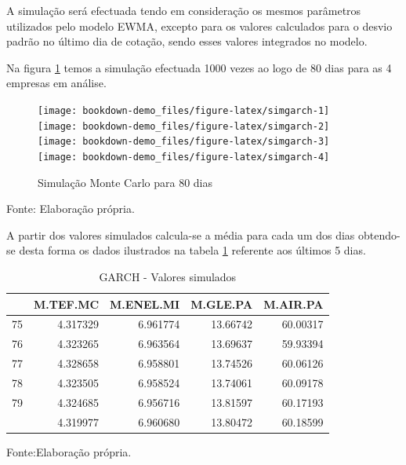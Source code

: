 \documentclass[
  12pt,
  a4paper,
  openany]{book}
\begin{document}
A simulação será efectuada tendo em consideração os mesmos parâmetros utilizados pelo modelo EWMA, excepto para os valores calculados para o desvio padrão no último dia de cotação, sendo esses valores integrados no modelo.

Na figura \ref{fig:simgarch} temos a simulação efectuada 1000 vezes ao logo de 80 dias para as 4 empresas em análise.

\begin{figure}

{\centering \texttt{[image: bookdown-demo\_files/figure-latex/simgarch-1]} \texttt{[image: bookdown-demo\_files/figure-latex/simgarch-2]} \texttt{[image: bookdown-demo\_files/figure-latex/simgarch-3]} \texttt{[image: bookdown-demo\_files/figure-latex/simgarch-4]} 

}

\caption{Simulação Monte Carlo para 80 dias}\label{fig:simgarch}
\end{figure}
\FloatBarrier
\centering

Fonte: Elaboração própria.

\justifying
\bigskip

A partir dos valores simulados calcula-se a média para cada um dos dias obtendo-se desta forma os dados ilustrados na tabela \ref{tab:simtabgarch} referente aos últimos 5 dias.

\begin{table}[!h]

\caption{\label{tab:simtabgarch}GARCH - Valores simulados}
\centering
\begin{tabular}[t]{lrrrr}
\toprule
  & M.TEF.MC & M.ENEL.MI & M.GLE.PA & M.AIR.PA\\
\midrule
75 & 4.317329 & 6.961774 & 13.66742 & 60.00317\\
76 & 4.323265 & 6.963564 & 13.69637 & 59.93394\\
77 & 4.328658 & 6.958801 & 13.74526 & 60.06126\\
78 & 4.323505 & 6.958524 & 13.74061 & 60.09178\\
79 & 4.324685 & 6.956716 & 13.81597 & 60.17193\\
\addlinespace
80 & 4.319977 & 6.960680 & 13.80472 & 60.18599\\
\bottomrule
\end{tabular}
\end{table}
\FloatBarrier
\centering

Fonte:Elaboração própria.

\justifying
\bigskip
\end{document}

